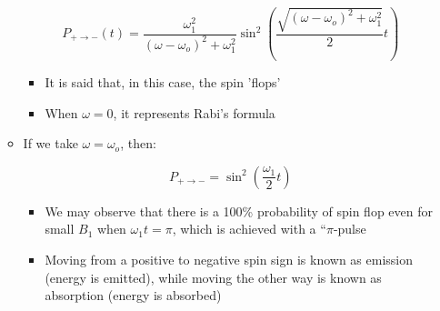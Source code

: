 \begin{itemize}
\begin{itemize}
          $$P_{+\to-}(t)=\frac{\omega_1^2}{(\omega-\omega_o)^2+\omega_1^2}\sin^2\left( \frac{\sqrt{(\omega-\omega_o)^2+\omega_1^2}}{2} t\right)$$

          \begin{itemize}

            \item It is said that, in this case, the spin 'flops'
              
            \item When $\omega=0$, it represents Rabi's formula

          \end{itemize}

        \item If we take $\omega=\omega_o$, then:

          $$P_{+\to-}=\sin^2\left( \frac{\omega_1}{2}t \right)$$

          \begin{itemize}

            \item We may observe that there is a 100\% probability of spin flop even for small $B_1$ when $\omega_1t=\pi$, which is achieved with a ``$\pi$-pulse

            \item Moving from a positive to negative spin sign is known as emission (energy is emitted), while moving the other way is known as absorption (energy is absorbed)

          \end{itemize}

    \end{itemize}

\end{itemize}



